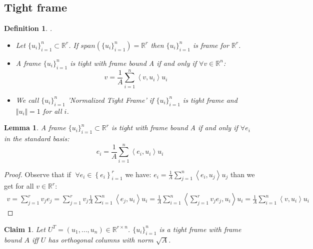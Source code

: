\documentclass{article}
\newtheorem{definition}{Definition}
\newtheorem{lemma}[theorem]{Lemma}
\newtheorem{claim}{Claim}
\begin{document}
\subsection{Tight frame}

\begin{definition}.
\begin{itemize}
    \item Let $\{u_i\}_{i=1}^n\subset\mathbb{R}^r$. If $span(\{u_i\}_{i=1}^n)=\mathbb{R}^r$ then $\{u_i\}_{i=1}^n$ is frame for $\mathbb{R}^r$.
    \item A frame $\{u_i\}_{i=1}^n$ is tight with frame bound A if and only if $\forall v\in\mathbb{R}^n$:
    $$v=\frac{1}{A}\sum_{i=1}^n\left<v,u_i\right>u_i$$
    \item We call $\{u_i\}_{i=1}^n$ 'Normalized Tight Frame' if $\{u_i\}_{i=1}^n$ is tight frame and $\Vert u_i\Vert=1$ for all $i$.
\end{itemize}
\end{definition}

\begin{lemma}\label{standard basis enough}
A frame $\{u_i\}_{i=1}^n\subset\mathbb{R}^r$ is tight with frame bound A if and only if $\forall e_i$ in the standard basis:
    $$e_i=\frac{1}{A}\sum_{i=1}^n\left<e_i,u_i\right>u_i$$
\end{lemma}

\begin{proof}
Observe that if $\;\forall e_{i}\in\left\{ e_{i}\right\} _{i=1}^{r}$ we have: $e_{i}=\frac{1}{A}\sum_{j=1}^{n}\left\langle e_{i},u_{j}\right\rangle u_{j}$ than we get for all $v\in\mathbb{R}^{r}$:
\begin{align*}
    v=	\sum_{j=1}^{r}v_{j}e_{j}
=	\sum_{j=1}^{r}v_{j}\frac{1}{A}\sum_{i=1}^{n}\left\langle e_{j},u_{i}\right\rangle u_{i}
=	\frac{1}{A}\sum_{i=1}^{n}\left\langle \sum_{j=1}^{r}v_{j}e_{j},u_{i}\right\rangle u_{i}
=	\frac{1}{A}\sum_{i=1}^{n}\left\langle v,u_{i}\right\rangle u_{i}
\end{align*}
\end{proof}

\begin{claim} \label{tight frame iff scaled orthonormal}
Let $U^T=(u_1,...,u_n)\in\mathbb{R}^{r\times n}$. $\{u_i\}_{i=1}^n$ is a tight frame with frame bound $A$ iff $U$ has orthogonal columns with norm $\sqrt{A}$. 
\end{claim}
\end{document}
